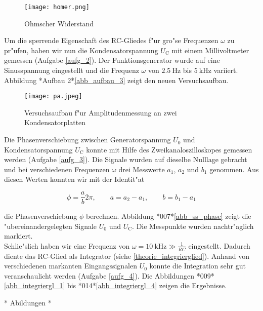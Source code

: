 \documentclass{scrartcl}
\begin{document}
			\begin{figure}[ht]
				\centering
				\texttt{[image: homer.png]}
					\caption {Ohmscher Widerstand}
			\end{figure}

			Um die sperrende Eigenschaft des RC-Gliedes f"ur gro"se Frequenzen $\omega$ zu pr"ufen, haben wir nun die Kondensatorspannung $U_{\mathrm{C}}$ mit einem Millivoltmeter gemessen (Aufgabe \ref{aufg_2}).
			Der Funktions\-generator wurde auf eine Sinusspannung eingestellt und die Frequenz $\omega$ von $\SI{2.5}{\hertz}$ bis $\SI{5}{\kilo\hertz}$ variiert. Abbildung *Aufbau 2*\ref{abb_aufbau_3} zeigt den neuen Versuchsaufbau. \\

			\begin{figure}[ht]
				\centering
				\texttt{[image: pa.jpeg]}
					\caption {Versuchsaufbau f"ur Amplitudenmessung an zwei Kondensatorplatten}
			\end{figure}

			Die Phasenverschiebung zwischen Generatorspannung $U_0$ und Kondensatorspannung $U_{\mathrm{C}}$ konnte mit Hilfe des Zweikanaloszilloskopes gemessen werden (Aufgabe \ref{aufg_3}).
			Die Signale wurden auf dieselbe Nulllage gebracht und bei verschiedenen Frequenzen $\omega$ drei Mes\-swerte $a_1$, $a_2$ und $b_1$ genommen.
			Aus diesen Werten konnten wir mit der Identit"at

			\begin{equation}
				\phi = \frac{a}{b} 2 \pi, \qquad
				a = a_2 - a_1, \qquad b = b_1 - a_1
			\end{equation}

			die Phasenverschiebung $\phi$ berechnen.
			Abbildung *007*\ref{abb_ss_phase} zeigt die "ubereinandergelegten Signale $U_0$ und $U_{\mathrm{C}}$. Die Messpunkte wurden nachtr"aglich markiert.\\

			Schlie"slich haben wir eine Frequenz von $\omega = \SI{10}{\kilo\hertz} \gg \frac{1}{RC}$ eingestellt.
			Dadurch diente das RC-Glied als Integrator (siehe \ref{theorie_integrierglied}).
			Anhand von verschiedenen markanten Ein\-gangs\-sig\-nalen $U_0$ konnte die Integration sehr gut veranschaulicht werden (Aufgabe \ref{aufg_4}).
			Die Abbildungen *009*\ref{abb_integriergl_1} bis *014*\ref{abb_integriergl_4} zeigen die Ergebnisse.

			* Abildungen *
\end{document}
